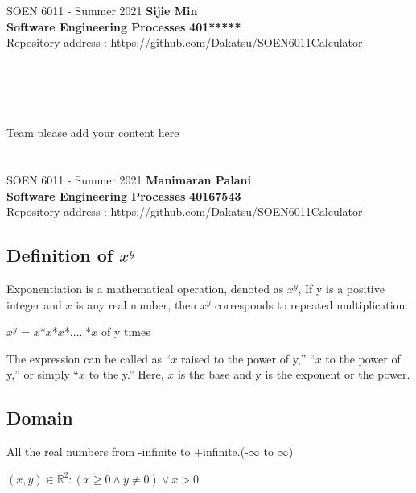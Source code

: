 \documentclass[a4paper, 11pt]{report}
\begin{document}
\section*{}
\normalsize {SOEN 6011 - Summer 2021} \hfill \textbf{Sijie Min} \\
\textbf{ Software Engineering Processes}  \hfill \textbf{401*****} \\
\hfill Repository address : https://github.com/Dakatsu/SOEN6011Calculator
\\\\\\\\\\
 \begin{center} Team please add your content here \end{center}
\pagebreak

\newcommand{\R}{\mathbb{R}}
\renewcommand{\labelitemi}{$\star$}
\section*{}
\normalsize {SOEN 6011 - Summer 2021} \hfill \textbf{Manimaran Palani} \\
\textbf{ Software Engineering Processes}  \hfill \textbf{40167543} \\
\hfill Repository address : https://github.com/Dakatsu/SOEN6011Calculator
\subsection*{Definition of \(x^y\)}
\cite{mathInsight} Exponentiation is a mathematical operation, denoted as \(x^y\), If y is a positive integer and \(x\) is any real number, then \(x^y\) corresponds to repeated multiplication.
 \begin{center} \(x^y\) = \(x\)*\(x\)*\(x\)*.....*\(x\) of y times \end{center}
The expression can be called as “\(x\) raised to the power of y,” “\(x\) to the power of y,” or simply “\(x\) to the y.” Here, \(x\) is the base and y is the exponent or the power.
\subsection*{Domain}
\cite{mathbits} All the real numbers from -infinite to +infinite.(-\(\infty\) to \(\infty\))
 \begin{center} $(x,y) \in \R^2 : (x \geq 0 \land y \neq 0) \lor x>0$ \end{center}
\end{document}
